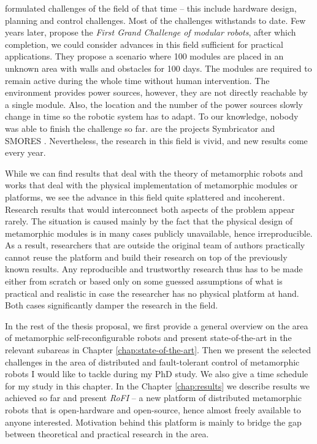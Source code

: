 \textcite{4141032} formulated challenges of the field of that time -- this
include hardware design, planning and control challenges. Most of the challenges
withstands to date. Few years later, \textcite{DBLP:journals/corr/abs-1108-5543}
propose the \emph{First Grand Challenge of modular robots}, after which
completion, we could consider advances in this field sufficient for practical
applications. They propose a scenario where 100 modules are placed in an unknown
area with walls and obstacles for 100 days. The modules are required to remain
active during the whole time without human intervention. The environment
provides power sources, however, they are not directly reachable by a single
module. Also, the location and the number of the power sources slowly change in
time so the robotic system has to adapt. To our knowledge, nobody was able to
finish the challenge so far.  are the projects Symbricator \textcite{DBLP:conf/syscon/LeviMRKVSLC14} and
SMORES \textcite{DBLP:journals/arobots/JingTYK18}. Nevertheless, the research in
this field is vivid, and new results come every year.

While we can find results that deal with the theory of metamorphic robots and
works that deal with the physical implementation of metamorphic modules or
platforms, we see the advance in this field quite splattered and incoherent.
Research results that would interconnect both aspects of the problem appear
rarely. The situation is caused mainly by the fact that the physical design of
metamorphic modules is in many cases publicly unavailable, hence irreproducible.
As a result, researchers that are outside the original team of authors
practically cannot reuse the platform and build their research on top of the
previously known results.  Any reproducible and trustworthy research thus has to
be made either from scratch or based only on some guessed assumptions of what is
practical and realistic in case the researcher has no physical platform at hand.
Both cases significantly damper the research in the field.

In the rest of the thesis proposal, we first provide a general overview on the
area of metamorphic self-reconfigurable robots and present state-of-the-art in
the relevant subareas in Chapter \ref{chap:state-of-the-art}. Then we present
the selected challenges in the area of distributed and fault-tolerant control of
metamorphic robots I would like to tackle during my PhD study. We also give a
time schedule for my study in this chapter. In the Chapter \ref{chap:results} we
describe results we achieved so far and present \emph{RoFI} -- a new platform of
distributed metamorphic robots that is open-hardware and open-source, hence
almost freely available to anyone interested. Motivation behind this platform is
mainly to bridge the gap between theoretical and practical research in the
area.

